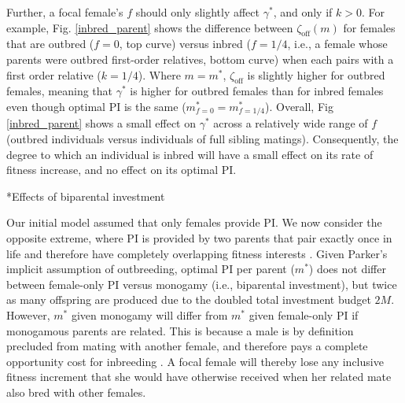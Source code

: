 \documentclass[12pt]{article}
\makeatletter
\renewcommand\subsection{\@startsection{subsection}{1}{-0.25in}{-0.5\baselineskip}{0.1\baselineskip}{\normalfont\normalsize\bfseries\textit}}
\makeatother
\begin{document}
Further, a focal female's $f$ should only slightly affect $\gamma^{*}$, and only if $k>0$. For example, Fig. \ref{inbred_parent} shows the difference between $\zeta_{\textrm{off}}(m)$ for females that are outbred ($f=0$, top curve) versus inbred ($f=1/4$, i.e., a female whose parents were outbred first-order relatives, bottom curve) when each pairs with a first order relative ($k=1/4$). Where $m=m^{*}$, $\zeta_{\textrm{off}}$ is slightly higher for outbred females, meaning that $\gamma^{*}$ is higher for outbred females than for inbred females even though optimal PI is the same ($m^{*}_{f=0}=m^{*}_{f=1/4}$). Overall, Fig \ref{inbred_parent} shows a small effect on $\gamma^{*}$ across a relatively wide range of $f$ (outbred individuals versus individuals of full sibling matings). Consequently, the degree to which an individual is inbred will have a small effect on its rate of fitness increase, and no effect on its optimal PI.

\subsection*{Effects of biparental investment}

Our initial model assumed that only females provide PI. We now consider the opposite extreme, where PI is provided by two parents that pair exactly once in life and therefore have completely overlapping fitness interests \cite[i.e., strict monogamy;][]{Parker1985}. Given Parker's \citeyearpar{Parker1985} implicit assumption of outbreeding, optimal PI per parent ($m^{*}$) does not differ between female-only PI versus monogamy (i.e., biparental investment), but twice as many offspring are produced due to the doubled total investment budget $2M$. However, $m^{*}$ given monogamy will differ from $m^{*}$ given female-only PI if monogamous parents are related. This is because a male is by definition precluded from mating with another female, and therefore pays a complete opportunity cost for inbreeding \cite[][]{Waser1986}. A focal female will thereby lose any inclusive fitness increment that she would have otherwise received when her related mate also bred with other females. 
\end{document}
